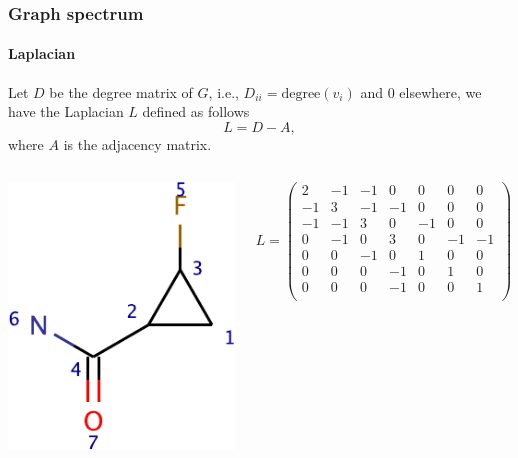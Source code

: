 \documentclass{beamer}
\begin{document}
\begin{frame}
  \frametitle{Graph spectrum}
  \framesubtitle{Laplacian}
  Let $D$ be the degree matrix of $G$, i.e., $D_{ii} =
  \text{degree}(v_i)$ and 0 elsewhere, we have the Laplacian $L$
  defined as follows
  \[
  L = D - A,
  \]
  where $A$ is the adjacency matrix.
  \begin{columns}
    \centerline{\includegraphics[width=1 true in]{test0-crop}}
    \[
    L = \left(\begin{array}{rrrrrrr}
  2&-1&-1&0&0&0&0 \\
-1&3&-1&-1&0&0&0 \\
-1&-1&3&0&-1&0&0 \\
0&-1&0&3&0&-1&-1 \\
0&0&-1&0&1&0&0 \\
0&0&0&-1&0&1&0 \\
0&0&0&-1&0&0&1 \\
    \end{array}\right)
    \]
  \end{columns}
\end{frame}
\end{document}
